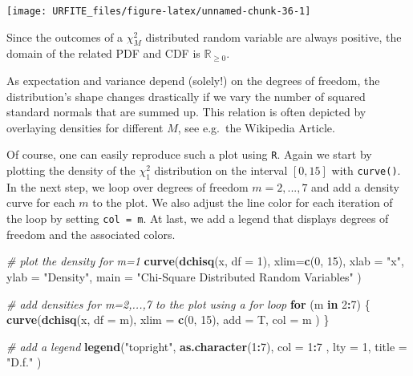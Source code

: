 \documentclass[]{book}
\newenvironment{Shaded}{\begin{snugshade}}{\end{snugshade}}
\newcommand{\KeywordTok}[1]{\textcolor[rgb]{0.13,0.29,0.53}{\textbf{#1}}}
\newcommand{\DataTypeTok}[1]{\textcolor[rgb]{0.13,0.29,0.53}{#1}}
\newcommand{\DecValTok}[1]{\textcolor[rgb]{0.00,0.00,0.81}{#1}}
\newcommand{\StringTok}[1]{\textcolor[rgb]{0.31,0.60,0.02}{#1}}
\newcommand{\CommentTok}[1]{\textcolor[rgb]{0.56,0.35,0.01}{\textit{#1}}}
\newcommand{\ControlFlowTok}[1]{\textcolor[rgb]{0.13,0.29,0.53}{\textbf{#1}}}
\newcommand{\OperatorTok}[1]{\textcolor[rgb]{0.81,0.36,0.00}{\textbf{#1}}}
\newcommand{\NormalTok}[1]{#1}
\theoremstyle{definition}
\theoremstyle{definition}
\theoremstyle{definition}
\theoremstyle{remark}
\begin{document}
\begin{center}\texttt{[image: URFITE\_files/figure-latex/unnamed-chunk-36-1]} \end{center}

Since the outcomes of a \(\chi^2_M\) distributed random variable are
always positive, the domain of the related PDF and CDF is
\(\mathbb{R}_{\geq0}\).

As expectation and variance depend (solely!) on the degrees of freedom,
the distribution's shape changes drastically if we vary the number of
squared standard normals that are summed up. This relation is often
depicted by overlaying densities for different \(M\), see e.g.~the
Wikipedia Article.

Of course, one can easily reproduce such a plot using \texttt{R}. Again
we start by plotting the density of the \(\chi_1^2\) distribution on the
interval \([0,15]\) with \texttt{curve()}. In the next step, we loop
over degrees of freedom \(m=2,...,7\) and add a density curve for each
\(m\) to the plot. We also adjust the line color for each iteration of
the loop by setting \texttt{col = m}. At last, we add a legend that
displays degrees of freedom and the associated colors.

\begin{Shaded}
\begin{Highlighting}[]
\CommentTok{# plot the density for m=1}
\KeywordTok{curve}\NormalTok{(}\KeywordTok{dchisq}\NormalTok{(x, }\DataTypeTok{df =} \DecValTok{1}\NormalTok{), }
      \DataTypeTok{xlim=}\KeywordTok{c}\NormalTok{(}\DecValTok{0}\NormalTok{, }\DecValTok{15}\NormalTok{), }
      \DataTypeTok{xlab =} \StringTok{"x"}\NormalTok{, }
      \DataTypeTok{ylab =} \StringTok{"Density"}\NormalTok{, }
      \DataTypeTok{main =} \StringTok{"Chi-Square Distributed Random Variables"}
\NormalTok{      )}

\CommentTok{# add densities for m=2,...,7 to the plot using a for loop }
\ControlFlowTok{for}\NormalTok{ (m }\ControlFlowTok{in} \DecValTok{2}\OperatorTok{:}\DecValTok{7}\NormalTok{) \{}
  \KeywordTok{curve}\NormalTok{(}\KeywordTok{dchisq}\NormalTok{(x, }\DataTypeTok{df =}\NormalTok{ m),}
        \DataTypeTok{xlim =} \KeywordTok{c}\NormalTok{(}\DecValTok{0}\NormalTok{, }\DecValTok{15}\NormalTok{), }
        \DataTypeTok{add =}\NormalTok{ T, }
        \DataTypeTok{col =}\NormalTok{ m}
\NormalTok{        )}
\NormalTok{\}}

\CommentTok{# add a legend}
\KeywordTok{legend}\NormalTok{(}\StringTok{"topright"}\NormalTok{, }
       \KeywordTok{as.character}\NormalTok{(}\DecValTok{1}\OperatorTok{:}\DecValTok{7}\NormalTok{), }
       \DataTypeTok{col =} \DecValTok{1}\OperatorTok{:}\DecValTok{7}\NormalTok{ , }
       \DataTypeTok{lty =} \DecValTok{1}\NormalTok{, }
       \DataTypeTok{title =} \StringTok{"D.f."}
\NormalTok{       )}
\end{Highlighting}
\end{Shaded}
\end{document}
